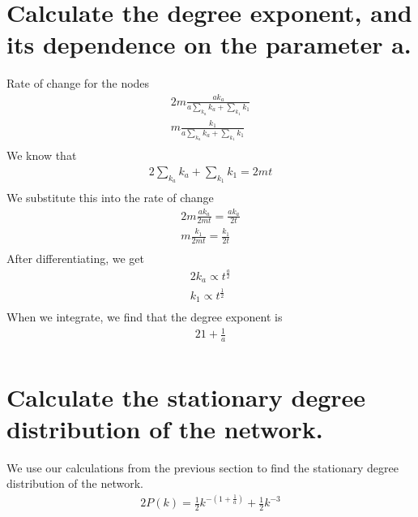\documentclass{article}%
\begin{document}
%
\normalsize%
\section{Calculate the degree exponent, and its dependence on the parameter a.}%
\label{sec:Calculatethedegreeexponent,anditsdependenceontheparametera.}%
Rate of change for the nodes%
\begin{alignat*}{2}%
m\frac{ak_a}{a\sum_{k_a}k_a+\sum_{k_1}k_1}\\%
m\frac{k_1}{a\sum_{k_a}k_a+\sum_{k_1}k_1}\\%
\end{alignat*}%
We know that%
\begin{alignat*}{2}%
\sum_{k_a}k_a + \sum_{k_1}k_1 = 2mt\\%
\end{alignat*}%
We substitute this into the rate of change%
\begin{alignat*}{2}%
m\frac{ak_a}{2mt} = \frac{ak_a}{2t}\\%
m\frac{k_1}{2mt} = \frac{k_1}{2t}\\%
\end{alignat*}%
After differentiating, we get%
\begin{alignat*}{2}%
k_a \propto t^{\frac{a}{2}}\\%
k_1 \propto t^{\frac{1}{2}}\\%
\end{alignat*}%
When we integrate, we find that the degree exponent is%
\begin{alignat*}{2}%
1 + \frac{1}{a}\\%
\end{alignat*}

%
\section{Calculate the stationary degree distribution of the network.}%
\label{sec:Calculatethestationarydegreedistributionofthenetwork.}%
We use our calculations from the previous section to find the stationary degree distribution of the network.%
\begin{alignat*}{2}%
P(k) = \frac{1}{2}k^{-(1+\frac{1}{a})} + \frac{1}{2}k^{-3}\\%
\end{alignat*}

%
\end{document}
